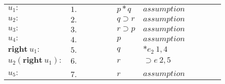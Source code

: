 \documentclass[11pt,a4paper]{article}
\begin{document}
\begin{itemize}
\begin{table}[H]
\begin{tabular}{*{12}{l}}
			\cline{3-12}
			
			$u_1:$ & $1.$ &\multicolumn{1}{|c}{} & & & & $p * q$ & $assumption$ & & & &\multicolumn{1}{c|}{}\\
						
			\cline{4-11}
			
			$u_2:$ & $2.$ & \multicolumn{1}{|c}{} & \multicolumn{1}{|c}{} & & & $q \supset r$ & $assumption$ & & & \multicolumn{1}{c|}{} &\multicolumn{1}{c|}{}\\
			
			\cline{5-10}
			
			$u_3:$ & $3.$ & \multicolumn{1}{|c}{} & \multicolumn{1}{|c}{} & \multicolumn{1}{|c}{} & & $r \supset  p$ & $assumption$ & & \multicolumn{1}{c|}{} & \multicolumn{1}{c|}{} &\multicolumn{1}{c|}{}\\
			
			\cline{6-9}
			
			$u_4:$ & $4.$ & \multicolumn{1}{|c}{} & \multicolumn{1}{|c}{} & \multicolumn{1}{|c}{} & \multicolumn{1}{|c}{} & $p$ & $assumption$ & \multicolumn{1}{c|}{} & \multicolumn{1}{c|}{} & \multicolumn{1}{c|}{} &\multicolumn{1}{c|}{}\\
			
			$\textbf{right} \ u_1:$ & $5.$ & \multicolumn{1}{|c}{} & \multicolumn{1}{|c}{} & \multicolumn{1}{|c}{} & \multicolumn{1}{|c}{} & $q$ & $*e_2 \ 1, 4$ & \multicolumn{1}{c|}{} & \multicolumn{1}{c|}{} & \multicolumn{1}{c|}{} &\multicolumn{1}{c|}{}\\
			
			$u_2(\textbf{right} \ u_1):$ & $6.$ & \multicolumn{1}{|c}{} & \multicolumn{1}{|c}{} & \multicolumn{1}{|c}{} & \multicolumn{1}{|c}{} & $r$ & $\supset e \ 2, 5$ & \multicolumn{1}{c|}{} & \multicolumn{1}{c|}{} & \multicolumn{1}{c|}{} &\multicolumn{1}{c|}{}\\
			
			\cline{6-9}
			
			\vspace{-0.4cm}&& \multicolumn{1}{|c}{} & \multicolumn{1}{|c}{} & \multicolumn{1}{|c}{} &&&&& \multicolumn{1}{c|}{} & \multicolumn{1}{c|}{} &\multicolumn{1}{c|}{}\\
			
			\cline{6-9}
			
			$u_5:$ & $7.$ & \multicolumn{1}{|c}{} & \multicolumn{1}{|c}{} & \multicolumn{1}{|c}{} & \multicolumn{1}{|c}{} & $r$ & $assumption$ & \multicolumn{1}{c|}{} & \multicolumn{1}{c|}{} & \multicolumn{1}{c|}{} &\multicolumn{1}{c|}{}\\
			

\end{tabular}
\end{table}
\end{itemize}
\end{document}
